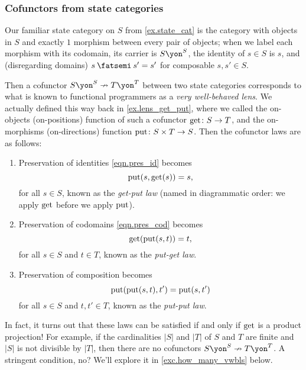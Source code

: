 \documentclass[Book-Poly]{subfiles}
\begin{document}
\subsubsection{Cofunctors from state categories}


\begin{example} \label{ex.very_well_behaved_lenses}
Our familiar state category on $S$ from \cref{ex.state_cat} is the category with objects in $S$ and exactly $1$ morphism between every pair of objects; when we label each morphism with its codomain, its carrier is $S\yon^S$, the identity of $s\in S$ is $s$, and (disregarding domains) $s\then s'=s'$ for composable $s,s'\in S$.

Then a cofunctor $S\yon^S\cof T\yon^T$ between two state categories corresponds to what is known to functional programmers as a \emph{very well-behaved lens}.
We actually defined this way back in \cref{ex.lens_get_put}, where we called the on-objects (on-positions) function of such a cofunctor $\mathrm{get}\colon S\to T$, and the on-morphisms (on-directions) function $\mathrm{put}\colon S\times T\to S$.%
Then the cofunctor laws are as follows:
\begin{enumerate}
    \item Preservation of identities \eqref{eqn.pres_id} becomes
    \[
        \mathrm{put}(s,\mathrm{get}(s))=s,
    \]
    for all $s\in S$, known as the \emph{get-put law} (named in diagrammatic order: we apply $\mathrm{get}$ before we apply $\mathrm{put}$).
    
    \item Preservation of codomains \eqref{eqn.pres_cod} becomes
    \[
        \mathrm{get}(\mathrm{put}(s,t))=t,
    \]
    for all $s\in S$ and $t\in T$, known as the \emph{put-get law}.
    
    \item Preservation of composition becomes
    \[
        \mathrm{put}(\mathrm{put}(s,t),t')=\mathrm{put}(s,t')
    \]
    for all $s\in S$ and $t,t'\in T$, known as the \emph{put-put law}.
\end{enumerate}

In fact, it turns out that these laws can be satisfied if and only if $\mathrm{get}$ is a product projection! 
For example, if the cardinalities $|S|$ and $|T|$ of $S$ and $T$ are finite and $|S|$ is not divisible by $|T|$, then there are no cofunctors $S\yon^S\cof T\yon^T$.
A stringent condition, no?
We'll explore it in  \cref{exc.how_many_vwbls} below.


\end{example}
\end{document}
